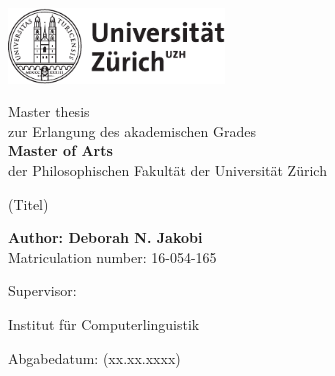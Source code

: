 \begin{titlepage}
\includegraphics[height=20mm]{images/uzh_logo_d_pos}\\

\begin{center}

{\sffamily
Master thesis \\
zur Erlangung des akademischen Grades \\
\textbf{Master of Arts} \\
der Philosophischen Fakultät der Universität Zürich \\

\vspace{2cm}

{\Huge (Titel)}\\

\vspace{4cm}

\textbf{Author: Deborah N. Jakobi} \\
	Matriculation number: 16-054-165 \\

\vspace{2cm}

Supervisor: 

Institut f\"ur Computerlinguistik

\vfill Abgabedatum: (xx.xx.xxxx)

\vspace{3cm}
}
\end{center}

\end{titlepage}

\newpage
